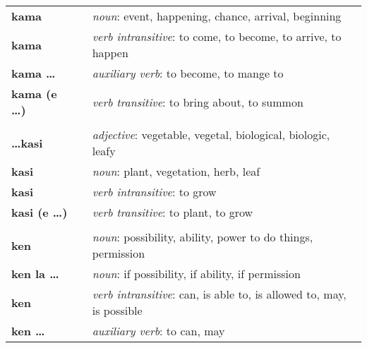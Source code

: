 \begin{supertabular}{p{2,5cm}|ll}
    \textbf{kama}                &  & \textit{noun}: event, happening, chance, arrival, beginning                                                \\
    \textbf{kama}                &  & \textit{verb intransitive}: to come, to become, to arrive, to happen                                       \\
    \textbf{kama \dots}          &  & \textit{auxiliary verb}: to become, to mange to                                                            \\
    \textbf{kama (e \dots)}      &  & \textit{verb transitive}: to bring about, to summon                                                        \\
                                 &  &                                                                                                            \\ %
    \textbf{\dots kasi}          &  & \textit{adjective}: vegetable, vegetal, biological, biologic, leafy                                        \\
    \textbf{kasi}                &  & \textit{noun}: plant, vegetation, herb, leaf                                                               \\
    \textbf{kasi}                &  & \textit{verb intransitive}: to grow                                                                        \\
    \textbf{kasi (e \dots)}      &  & \textit{verb transitive}: to plant, to grow                                                                \\
                                 &  &                                                                                                            \\ %
    \textbf{ken}                 &  & \textit{noun}: possibility, ability, power to do things, permission                                        \\
    \textbf{ken la \dots}        &  & \textit{noun}: if possibility, if ability, if permission                                                   \\
    \textbf{ken}                 &  & \textit{verb intransitive}: can, is able to, is allowed to, may, is possible                               \\
    \textbf{ken \dots}           &  & \textit{auxiliary verb}: to can, may                                                                       \\

\end{supertabular}
